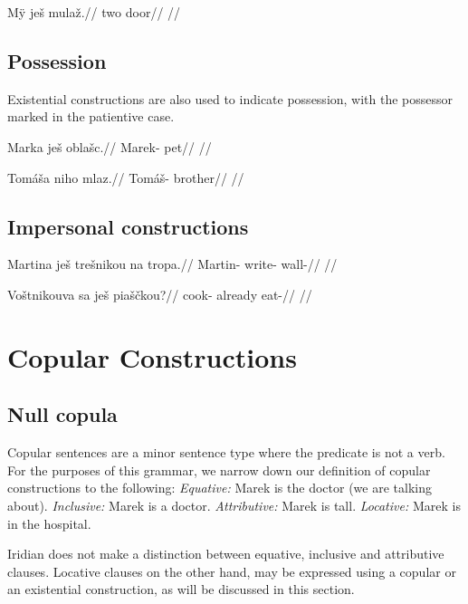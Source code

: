 \pex
\begingl
\gla M\"y je\v{s} mula\v{z}.//
\glb two  door//
\glft {}//
\endgl
\xe



\subsection{Possession}
Existential constructions are also used to indicate possession, with the possessor marked in the patientive case.

\pex
\begingl
\gla Marka je\v{s} obla\v{s}c.//
\glb Marek-  pet//
\glft {}//
\endgl
\xe

\pex
\begingl
\gla Tom\'a\v{s}a niho mlaz.//
\glb Tom\'a\v{s}-  brother//
\glft {}//
\endgl
\xe

\subsection{Impersonal constructions}
\pex
\begingl
\gla Martina je\v{s} tre\v{s}nikou na tropa.//
\glb Martin-  write-  wall-//
\glft {}//
\endgl
\xe

\pex
\begingl
\gla Vo\v{s}tnikouva sa je\v{s} pia\v{s}\v{c}kou?//
\glb cook- already  eat-//
\glft {}//
\endgl
\xe

\section{Copular Constructions}
\subsection{Null copula}

Copular sentences are a minor sentence type where the predicate is not a verb. For the purposes of this grammar, we narrow down our definition of copular constructions to the following:
\pex
\a \textit{Equative:} Marek is the doctor (we are talking about).
\a \textit{Inclusive:} Marek is a doctor.
\a \textit{Attributive:} Marek is tall.
\a \textit{Locative:} Marek is in the hospital.
\xe

Iridian does not make a distinction between equative, inclusive and attributive clauses. Locative clauses on the other hand, may be expressed using a copular or an existential construction, as will be discussed in this section.

